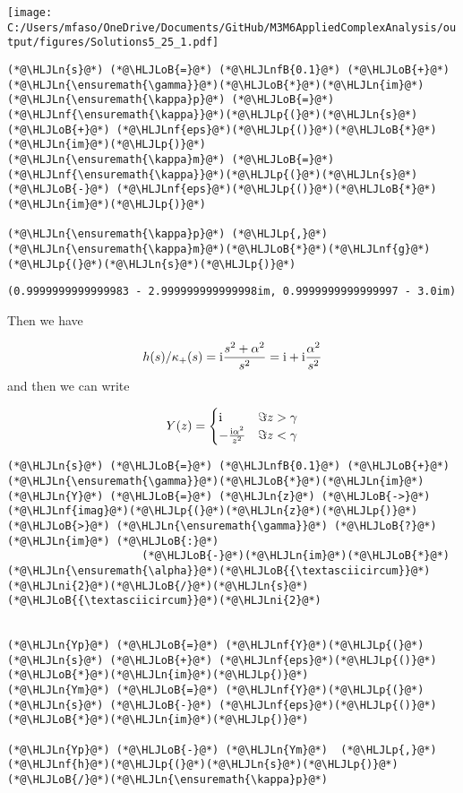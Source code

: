 \documentclass[12pt,a4paper]{article}
\newcommand{\HLJLn}[1]{#1}
\newcommand{\HLJLnf}[1]{\textcolor[RGB]{66,102,213}{#1}}
\newcommand{\HLJLnfB}[1]{\textcolor[RGB]{59,151,46}{#1}}
\newcommand{\HLJLni}[1]{\textcolor[RGB]{59,151,46}{#1}}
\newcommand{\HLJLoB}[1]{\textcolor[RGB]{102,102,102}{\textbf{#1}}}
\newcommand{\HLJLp}[1]{#1}
\def\I{ {\rm i} }
\begin{document}
\texttt{[image: C:/Users/mfaso/OneDrive/Documents/GitHub/M3M6AppliedComplexAnalysis/output/figures/Solutions5\_25\_1.pdf]}

\begin{lstlisting}
(*@\HLJLn{s}@*) (*@\HLJLoB{=}@*) (*@\HLJLnfB{0.1}@*) (*@\HLJLoB{+}@*) (*@\HLJLn{\ensuremath{\gamma}}@*)(*@\HLJLoB{*}@*)(*@\HLJLn{im}@*)
(*@\HLJLn{\ensuremath{\kappa}p}@*) (*@\HLJLoB{=}@*) (*@\HLJLnf{\ensuremath{\kappa}}@*)(*@\HLJLp{(}@*)(*@\HLJLn{s}@*) (*@\HLJLoB{+}@*) (*@\HLJLnf{eps}@*)(*@\HLJLp{()}@*)(*@\HLJLoB{*}@*)(*@\HLJLn{im}@*)(*@\HLJLp{)}@*)
(*@\HLJLn{\ensuremath{\kappa}m}@*) (*@\HLJLoB{=}@*) (*@\HLJLnf{\ensuremath{\kappa}}@*)(*@\HLJLp{(}@*)(*@\HLJLn{s}@*) (*@\HLJLoB{-}@*) (*@\HLJLnf{eps}@*)(*@\HLJLp{()}@*)(*@\HLJLoB{*}@*)(*@\HLJLn{im}@*)(*@\HLJLp{)}@*)

(*@\HLJLn{\ensuremath{\kappa}p}@*) (*@\HLJLp{,}@*) (*@\HLJLn{\ensuremath{\kappa}m}@*)(*@\HLJLoB{*}@*)(*@\HLJLnf{g}@*)(*@\HLJLp{(}@*)(*@\HLJLn{s}@*)(*@\HLJLp{)}@*)
\end{lstlisting}

\begin{lstlisting}
(0.9999999999999983 - 2.999999999999998im, 0.9999999999999997 - 3.0im)
\end{lstlisting}


Then we have

\[
h(s)/\kappa_+(s) =  \I {s^2 + \alpha^2 \over s^2} = \I + \I {\alpha^2 \over s^2}
\]
and then we can write

\[
Y(z) = \begin{cases}
\I & \Im z > \gamma \\
-{\I \alpha^2 \over z^2} & \Im z < \gamma
\end{cases}
\]

\begin{lstlisting}
(*@\HLJLn{s}@*) (*@\HLJLoB{=}@*) (*@\HLJLnfB{0.1}@*) (*@\HLJLoB{+}@*) (*@\HLJLn{\ensuremath{\gamma}}@*)(*@\HLJLoB{*}@*)(*@\HLJLn{im}@*)
(*@\HLJLn{Y}@*) (*@\HLJLoB{=}@*) (*@\HLJLn{z}@*) (*@\HLJLoB{->}@*) (*@\HLJLnf{imag}@*)(*@\HLJLp{(}@*)(*@\HLJLn{z}@*)(*@\HLJLp{)}@*) (*@\HLJLoB{>}@*) (*@\HLJLn{\ensuremath{\gamma}}@*) (*@\HLJLoB{?}@*) (*@\HLJLn{im}@*) (*@\HLJLoB{:}@*)
                     (*@\HLJLoB{-}@*)(*@\HLJLn{im}@*)(*@\HLJLoB{*}@*)(*@\HLJLn{\ensuremath{\alpha}}@*)(*@\HLJLoB{{\textasciicircum}}@*)(*@\HLJLni{2}@*)(*@\HLJLoB{/}@*)(*@\HLJLn{s}@*)(*@\HLJLoB{{\textasciicircum}}@*)(*@\HLJLni{2}@*)


(*@\HLJLn{Yp}@*) (*@\HLJLoB{=}@*) (*@\HLJLnf{Y}@*)(*@\HLJLp{(}@*)(*@\HLJLn{s}@*) (*@\HLJLoB{+}@*) (*@\HLJLnf{eps}@*)(*@\HLJLp{()}@*)(*@\HLJLoB{*}@*)(*@\HLJLn{im}@*)(*@\HLJLp{)}@*)
(*@\HLJLn{Ym}@*) (*@\HLJLoB{=}@*) (*@\HLJLnf{Y}@*)(*@\HLJLp{(}@*)(*@\HLJLn{s}@*) (*@\HLJLoB{-}@*) (*@\HLJLnf{eps}@*)(*@\HLJLp{()}@*)(*@\HLJLoB{*}@*)(*@\HLJLn{im}@*)(*@\HLJLp{)}@*)

(*@\HLJLn{Yp}@*) (*@\HLJLoB{-}@*) (*@\HLJLn{Ym}@*)  (*@\HLJLp{,}@*) (*@\HLJLnf{h}@*)(*@\HLJLp{(}@*)(*@\HLJLn{s}@*)(*@\HLJLp{)}@*)(*@\HLJLoB{/}@*)(*@\HLJLn{\ensuremath{\kappa}p}@*)
\end{lstlisting}
\end{document}
